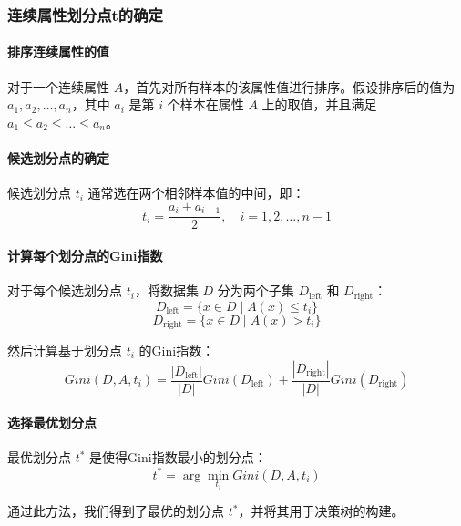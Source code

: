 \subsubsection{连续属性划分点t的确定}

\paragraph{排序连续属性的值}
对于一个连续属性 \(A\)，首先对所有样本的该属性值进行排序。假设排序后的值为 \(a_1, a_2, \dots, a_n\)，其中 \(a_i\) 是第 \(i\) 个样本在属性 \(A\) 上的取值，并且满足 \(a_1 \leq a_2 \leq \dots \leq a_n\)。

\paragraph{候选划分点的确定}
候选划分点 \(t_i\) 通常选在两个相邻样本值的中间，即：
\begin{equation}
t_i = \frac{a_i + a_{i+1}}{2}, \quad i = 1, 2, \dots, n-1
\end{equation}

\paragraph{计算每个划分点的Gini指数}
对于每个候选划分点 \(t_i\)，将数据集 \(D\) 分为两个子集 \(D_{\text{left}}\) 和 \(D_{\text{right}}\)：
\begin{equation}
D_{\text{left}} = \{x \in D \mid A(x) \leq t_i\}
\end{equation}
\begin{equation}
D_{\text{right}} = \{x \in D \mid A(x) > t_i\}
\end{equation}

然后计算基于划分点 \(t_i\) 的Gini指数：
\begin{equation}
Gini(D, A, t_i) = \frac{|D_{\text{left}}|}{|D|} Gini(D_{\text{left}}) + \frac{|D_{\text{right}}|}{|D|} Gini(D_{\text{right}})
\end{equation}

\paragraph{选择最优划分点}
最优划分点 \(t^*\) 是使得Gini指数最小的划分点：
\begin{equation}
t^* = \arg\min_{t_i} Gini(D, A, t_i)
\end{equation}

通过此方法，我们得到了最优的划分点 \(t^*\)，并将其用于决策树的构建。






